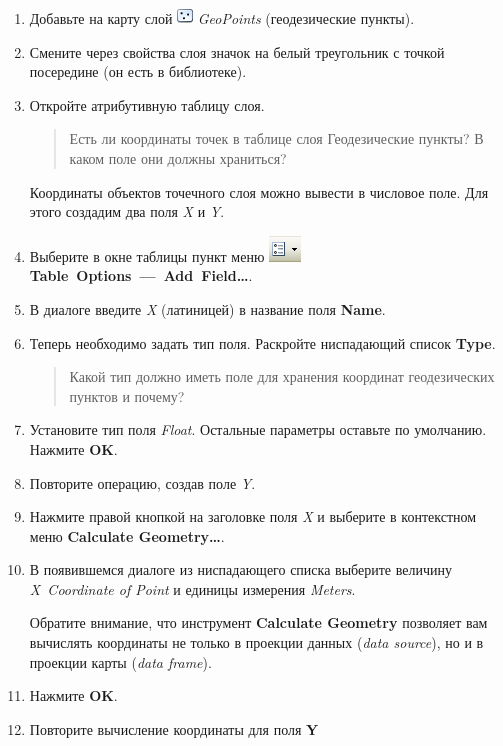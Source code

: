 \documentclass[]{book}
\theoremstyle{definition}
\theoremstyle{definition}
\theoremstyle{definition}
\theoremstyle{remark}
\begin{document}
\begin{enumerate}
\def\labelenumi{\arabic{enumi}.}
\item
  Добавьте на карту слой \includegraphics{images/Ex01/image7.png}
  \emph{GeoPoints} (геодезические пункты).
\item
  Смените через свойства слоя значок на белый треугольник с точкой
  посередине (он есть в библиотеке).
\item
  Откройте атрибутивную таблицу слоя.

  \begin{quote}
  Есть ли координаты точек в таблице слоя Геодезические пункты? В каком
  поле они должны храниться?
  \end{quote}

  Координаты объектов точечного слоя можно вывести в числовое поле. Для
  этого создадим два поля \emph{X} и \emph{Y}.
\item
  Выберите в окне таблицы пункт меню
  \includegraphics{images/Ex01/image24.png}
  \textbf{Table~Options~---~Add~Field\ldots{}}.
\item
  В диалоге введите \emph{X} (латиницей) в название поля \textbf{Name}.
\item
  Теперь необходимо задать тип поля. Раскройте ниспадающий список
  \textbf{Type}.

  \begin{quote}
  Какой тип должно иметь поле для хранения координат геодезических
  пунктов и почему?
  \end{quote}
\item
  Установите тип поля \emph{Float}. Остальные параметры оставьте по
  умолчанию. Нажмите \textbf{OK}.
\item
  Повторите операцию, создав поле \emph{Y}.
\item
  Нажмите правой кнопкой на заголовке поля \emph{X} и выберите в
  контекстном меню \textbf{Calculate Geometry\ldots{}}.
\item
  В появившемся диалоге из ниспадающего списка выберите величину
  \emph{X~Coordinate of Point} и единицы измерения \emph{Meters}.

  Обратите внимание, что инструмент \textbf{Calculate Geometry}
  позволяет вам вычислять координаты не только в проекции данных
  (\emph{data source}), но и в проекции карты (\emph{data frame}).
\item
  Нажмите \textbf{OK}.
\item
  Повторите вычисление координаты для поля \textbf{Y}


\end{enumerate}
\end{document}
